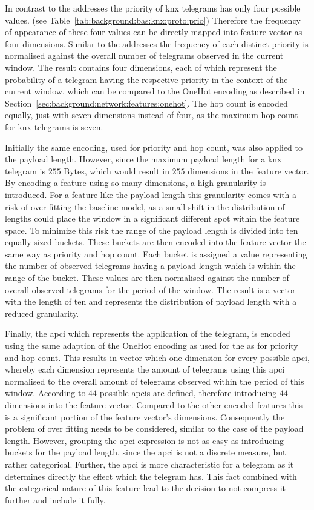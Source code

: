In contrast to the addresses the priority of \gls{knx} telegrams has only four possible values. (see Table~\ref{tab:background:bas:knx:proto:prio}) Therefore the frequency of appearance of these four values can be directly mapped into feature vector as four dimensions. Similar to the addresses the frequency of each distinct priority is normalised against the overall number of telegrams observed in the current window.
The result contains four dimensions, each of which represent the probability of a telegram having the respective priority in the context of the current window, which can be compared to the OneHot encoding as described in Section~\ref{sec:background:network:features:onehot}.
The hop count is encoded equally, just with seven dimensions instead of four, as the maximum hop count for \gls{knx} telegrams is seven.

Initially the same encoding, used for priority and hop count, was also applied to the payload length. However, since the maximum payload length for a \gls{knx} telegram is $255$ Bytes, which would result in $255$ dimensions in the feature vector.
By encoding a feature using so many dimensions, a high granularity is introduced. For a feature like the payload length this granularity comes with a risk of over fitting the baseline model, as a small shift in the distribution of lengths could place the window in a significant different spot within the feature space.
To minimize this risk the range of the payload length is divided into ten equally sized buckets. These buckets are then encoded into the feature vector the same way as priority and hop count.
Each bucket is assigned a value representing the number of observed telegrams having a payload length which is within the range of the bucket. These values are then normalised against the number of overall observed telegrams for the period of the window.
The result is a vector with the length of ten and represents the distribution of payload length with a reduced granularity.

Finally, the \gls{apci} which represents the application of the telegram, is encoded using the same adaption of the OneHot encoding as used for the as for priority and hop count. This results in vector which one dimension for every possible \gls{apci}, whereby each dimension represents the amount of telegrams using this \gls{apci} normalised to the overall amount of telegrams observed within the period of this window.
According to \textcite{DIN_EN_50090-4-1} $44$ possible \glspl{apci} are defined, therefore introducing $44$ dimensions into the feature vector.
Compared to the other encoded features this is a significant portion of the feature vector's dimensions. Consequently the problem of over fitting needs to be considered, similar to the case of the payload length.
However, grouping the \gls{apci} expression is not as easy as introducing buckets for the payload length, since the \gls{apci} is 
not a discrete measure, but rather categorical. Further, the \gls{apci} is more characteristic for a telegram as it determines directly the effect which the telegram has.
This fact combined with the categorical nature of this feature lead to the decision to not compress it further and include it fully.

